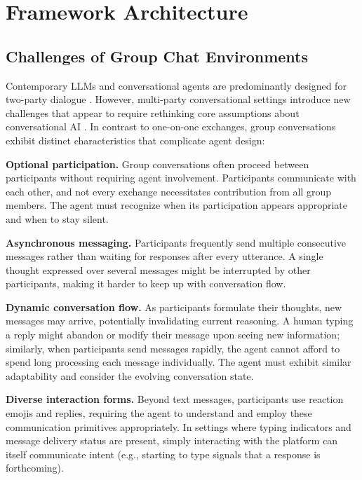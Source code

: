 \documentclass[twocolumn,10pt]{article}
\begin{document}
\section{Framework Architecture}
\label{sec:methodology}

\subsection{Challenges of Group Chat Environments}
\label{subsec:group-chat-challenges}

Contemporary LLMs and conversational agents are predominantly designed for two-party dialogue \cite{yi2024surveyrecentadvancesllmbased,shuster2023multiparty}. However, multi-party conversational settings introduce new challenges that appear to require rethinking core assumptions about conversational AI \cite{li2022whomsays,mahajan2025multiparty}. In contrast to one-on-one exchanges, group conversations exhibit distinct characteristics that complicate agent design:

\textbf{Optional participation.} Group conversations often proceed between participants without requiring agent involvement. Participants communicate with each other, and not every exchange necessitates contribution from all group members. The agent must recognize when its participation appears appropriate and when to stay silent.

\textbf{Asynchronous messaging.} Participants frequently send multiple consecutive messages rather than waiting for responses after every utterance. A single thought expressed over several messages might be interrupted by other participants, making it harder to keep up with conversation flow.

\textbf{Dynamic conversation flow.} As participants formulate their thoughts, new messages may arrive, potentially invalidating current reasoning. A human typing a reply might abandon or modify their message upon seeing new information; similarly, when participants send messages rapidly, the agent cannot afford to spend long processing each message individually. The agent must exhibit similar adaptability and consider the evolving conversation state.

\textbf{Diverse interaction forms.} Beyond text messages, participants use reaction emojis and replies, requiring the agent to understand and employ these communication primitives appropriately. In settings where typing indicators and message delivery status are present, simply interacting with the platform can itself communicate intent (e.g., starting to type signals that a response is forthcoming).
\end{document}
